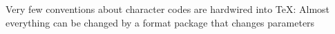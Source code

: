 \def\Russiantt#1{{\tt\hbox to.5em{\hss\eighttt\char#1\hss}}}
Very few conventions about character codes are hardwired into \TeX:
Almost everything can be changed by a format package that changes parameters
